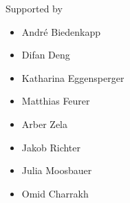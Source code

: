 \begin{frame}[c]{Supported by}


\begin{itemize}
	\item Andr\'e Biedenkapp
	\item Difan Deng
	\item Katharina Eggensperger
	\item Matthias Feurer
	\item Arber Zela
    \item Jakob Richter
    \item Julia Moosbauer
    \item Omid Charrakh
\end{itemize}

%
%
%
%
%
%
%
%
%


\end{frame}


